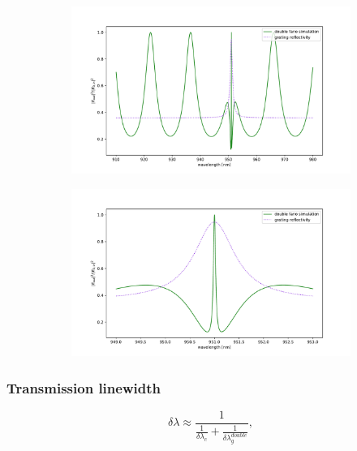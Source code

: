 \begin{figure}[h!]
    \centering
    \begin{subfigure}[c]{0.49\textwidth}
        \centering
        \includegraphics[width=\textwidth]{figures/double_fano_full_range_30um.pdf}
        \caption{}
        \label{fig:double_full_range}
    \end{subfigure}
    \begin{subfigure}[c]{0.49\textwidth}
        \includegraphics[width=\textwidth]{figures/double_fano_short_range_30um.pdf}
        \caption{}
        \label{fig:double_short_range}
    \end{subfigure}
    \caption{}
    \label{fig:double_fano_transmission}
\end{figure}

\subsubsection{Transmission linewidth}

\begin{equation}
    \delta \lambda \approx \frac{1}{\frac{1}{\delta \lambda_c} + \frac{1}{\delta \lambda_g^{double}}},
    \label{eq:analytical_linewidth_double}
\end{equation}

